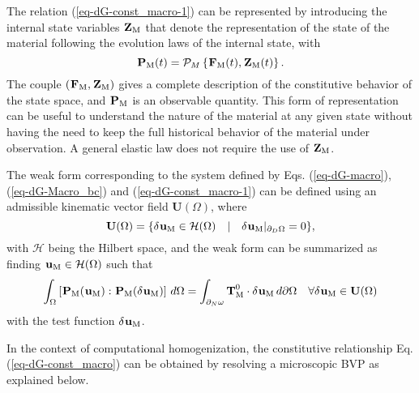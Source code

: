 The relation (\ref{eq-dG-const_macro-1}) can be represented by introducing the internal state variables $ \tgm[]{Z} $ that denote the representation of the state of the material following the evolution laws of the internal state, with 
\begin{equation}\label{eq-dG-const_macro}
\tgm[]{P}(t) = \mathcal{P}_M\left\{\tgm[]{F}(t),\tgm[]{Z}(t)\right\}.
\end{equation}
The couple $ (\tgm[]{F},\tgm[]{Z}) $ gives a complete description of the constitutive behavior of the state space, and $ \tgm[]{P} $ is an observable quantity. This form of representation can be useful to understand the nature of the material at any given state without having the need to keep the full historical behavior of the material under observation. A general elastic law does not require the use of $ \tgm[]{Z} $.

The weak form corresponding to the system defined by Eqs. (\ref{eq-dG-macro}), (\ref{eq-dG-Macro_bc}) and (\ref{eq-dG-const_macro-1}) can be defined using an admissible kinematic vector field $ \textbf{U}(\Omega) $, where
\begin{equation}\label{eq-dG-law1}
\textbf{U}(\Omega)=\{\delta\tgm{u}\in\mathcal{H}(\Omega)\quad|\quad\delta\tgm{u}|_{\partial_D\Omega}=0\},
\end{equation}
with $ \mathcal{H} $ being the Hilbert space, and the weak form can be summarized as finding $ \tgm{u}\in\mathcal{H}(\Omega) $ such that
\begin{equation}\label{eq-dG-bilinear}
\int_\Omega\left[\tgm{P}(\tgm{u}):\tgm{P}(\delta\tgm{u})\right]\,d\Omega=\int_{\partial_N\omega}\tgm{T}^0\cdot\delta\tgm{u}\,d\partial\Omega\quad\forall\delta\tgm{u}\in\textbf{U}(\Omega)
\end{equation}
with the test function $ \delta\tgm{u} $.

In the context of computational homogenization, the constitutive relationship Eq. (\ref{eq-dG-const_macro}) can be obtained by resolving a microscopic BVP as explained below.

